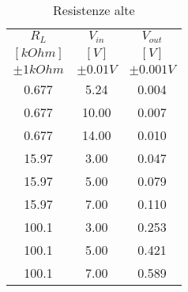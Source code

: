 \begin{table}[H]
\centering
\caption{Resistenze alte}
\begin{tabular}{|c|c|c|}
\hline
$R_L$	&	$V_{in}$ 	&	$V_{out}$	\\
$[kOhm]$	&	$[V]$	&	$[V]$	\\
$\pm 1 kOhm$ 	&	$\pm 0.01 V$	&	$\pm 0.001 V$	\\ \hline
0.677	&	5.24	&	0.004	\\
0.677	&	10.00	&	0.007	\\
0.677	&	14.00	&	0.010	\\ \hline
15.97	&	3.00	&	0.047	\\
15.97	&	5.00	&	0.079	\\
15.97	&	7.00	&	0.110	\\ \hline
100.1	&	3.00	&	0.253	\\
100.1	&	5.00	&	0.421	\\
100.1	&	7.00	&	0.589	\\ \hline
\end{tabular}
\label{}
\end{table}